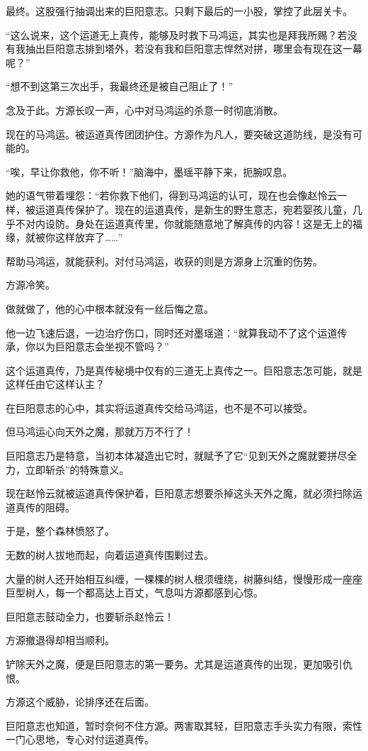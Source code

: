 \begin{this_body}
最终。这股强行抽调出来的巨阳意志。只剩下最后的一小股，掌控了此层关卡。

“这么说来，这个运道无上真传，能够及时救下马鸿运，其实也是拜我所赐？若没有我抽出巨阳意志排到塔外，若没有我和巨阳意志悍然对拼，哪里会有现在这一幕呢？”

“想不到这第三次出手，我最终还是被自己阻止了！”

念及于此。方源长叹一声，心中对马鸿运的杀意一时彻底消散。

现在的马鸿运。被运道真传团团护住。方源作为凡人，要突破这道防线，是没有可能的。

“唉，早让你救他，你不听！”脑海中，墨瑶平静下来，扼腕叹息。

她的语气带着埋怨：“若你救下他们，得到马鸿运的认可，现在也会像赵怜云一样，被运道真传保护了。现在的运道真传，是新生的野生意志，宛若婴孩儿童，几乎不对内设防。身处在运道真传里，你就能随意地了解真传的内容！这是无上的福缘，就被你这样放弃了……”

帮助马鸿运，就能获利。对付马鸿运，收获的则是方源身上沉重的伤势。

方源冷笑。

做就做了，他的心中根本就没有一丝后悔之意。

他一边飞速后退，一边治疗伤口，同时还对墨瑶道：“就算我动不了这个运道传承，你以为巨阳意志会坐视不管吗？”

这个运道真传，乃是真传秘境中仅有的三道无上真传之一。巨阳意志怎可能，就是这样任由它这样认主？

在巨阳意志的心中，其实将运道真传交给马鸿运，也不是不可以接受。

但马鸿运心向天外之魔，那就万万不行了！

巨阳意志乃是特意，当初本体凝造出它时，就赋予了它“见到天外之魔就要拼尽全力，立即斩杀”的特殊意义。

现在赵怜云就被运道真传保护着，巨阳意志想要杀掉这头天外之魔，就必须扫除运道真传的阻碍。

于是，整个森林愤怒了。

无数的树人拔地而起，向着运道真传围剿过去。

大量的树人还开始相互纠缠，一棵棵的树人根须缠绕，树藤纠结，慢慢形成一座座巨型树人，每一个都高达上百丈，气息叫方源都感到心惊。

巨阳意志鼓动全力，也要斩杀赵怜云！

方源撤退得却相当顺利。

铲除天外之魔，便是巨阳意志的第一要务。尤其是运道真传的出现，更加吸引仇恨。

方源这个威胁，论排序还在后面。

巨阳意志也知道，暂时奈何不住方源。两害取其轻，巨阳意志手头实力有限，索性一门心思地，专心对付运道真传。


\end{this_body}
